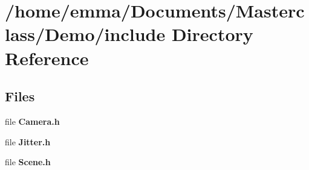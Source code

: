 \section{/home/emma/\+Documents/\+Masterclass/\+Demo/include Directory Reference}
\label{dir_05c42f56f56db2228fb9f2f3a16c0e1e}
\subsection*{Files}
\begin{DoxyCompactItemize}
\item 
file \textbf{ Camera.\+h}
\item 
file \textbf{ Jitter.\+h}
\item 
file \textbf{ Scene.\+h}
\end{DoxyCompactItemize}

